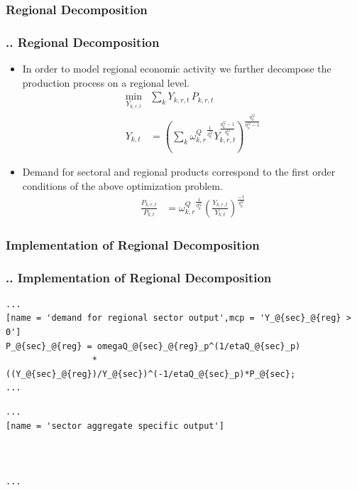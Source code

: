 \documentclass[11pt,aspectratio=169]{beamer}
\begin{document}
\subsubsection{Regional Decomposition}
\begin{frame}
\frametitle{{\thesection.\thesubsection.\thesubsubsection} Regional Decomposition}
\scriptsize
\begin{itemize}
\item In order to model regional economic activity we further decompose the production process on a regional level.
\begin{align*}
\underset{Y_{k,r,t}}{\mathrm{min}} & \sum_{k} Y_{k,r,t} \, P_{k,r,t} \\ 
Y_{k,t} &= \left(\sum_{k} {\omega^{Q}_{k,r}}^{\frac{1}{\eta^Q_{k}}} Y_{k,r,t}^{\frac{\eta^Q_{k}-1}{\eta^Q_{k}}} \right)^{\frac{\eta^Q_{k}}{\eta^Q_{k}-1}}
\end{align*}
\item Demand for sectoral and regional products correspond to the first order conditions of the above optimization problem.
\begin{align*}
\frac{P_{k,r,t}}{P_{k,t}} &= {\omega^{Q}_{k,r}}^{\frac{1}{\eta^{Q}_{k}}} \left(\frac{Y_{k,r,t}}{Y_{k,t}}\right)^{\frac{-1}{\eta^{Q}_{k}}}
\end{align*}
\end{itemize}
\end{frame}

\subsubsection{Implementation of Regional Decomposition}
\begin{frame}[fragile]
\frametitle{{\thesection.\thesubsection.\thesubsubsection} Implementation of Regional Decomposition}

\begin{lstlisting}[frame = single]
...
[name = 'demand for regional sector output',mcp = 'Y_@{sec}_@{reg} > 0']
P_@{sec}_@{reg} = omegaQ_@{sec}_@{reg}_p^(1/etaQ_@{sec}_p)
                 *((Y_@{sec}_@{reg})/Y_@{sec})^(-1/etaQ_@{sec}_p)*P_@{sec};
...
\end{lstlisting}

\begin{lstlisting}[frame = single]
...
[name = 'sector aggregate specific output']



...
\end{lstlisting}
\end{frame}
\end{document}
